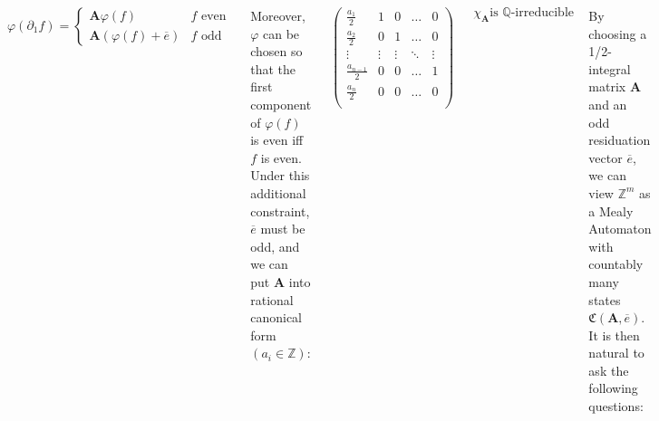\documentclass[24pt]{tikzposter}
\theoremstyle{definition}
\newcommand{\Z}{\mathbb{Z}}
\newcommand{\Q}{\mathbb{Q}}
\newcommand{\del}{\partial}
\begin{document}
\begin{columns}
{    \bigskip

    \[ 
      \varphi(\del_1 f) = 
      \begin{cases} 
        \mathbf{A} \varphi(f) & \text{$f$ even} \\
        \mathbf{A} (\varphi(f) + \overline{e}) & \text{$f$ odd}
      \end{cases}
    \]

    \bigskip
    \bigskip

    Moreover, $\varphi$ can be chosen so that the first component of 
    $\varphi(f)$ is even iff $f$ is even. Under this additional constraint,
    $\overline{e}$ must be odd, and we can put $\mathbf{A}$ into 
    rational canonical form $(a_{i} \in \Z)$:

    \[
      \begin{pmatrix}
        \frac{a_1}{2}     & 1      & 0      & \dots  & 0\\
        \frac{a_2}{2}     & 0      & 1      & \dots  & 0\\ 
        \vdots            & \vdots & \vdots & \ddots & \vdots\\
        \frac{a_{n-1}}{2} & 0      & 0      & \dots  & 1\\
        \frac{a_n}{2}     & 0      & 0      & \dots  & 0\\
      \end{pmatrix}
    \]

    \[ \chi_\mathbf{A} \text{is $\Q$-irreducible} \]

  }



  {
    By choosing a 1/2-integral matrix $\mathbf{A}$ and an odd residuation
    vector $\overline{e}$, we can view $\Z^m$ as a Mealy Automaton with
    countably many states $\mathfrak{C}(\mathbf{A},\overline{e})$. 
    It is then natural to ask the following questions:

    \begin{itemize}
      \item For which choices of $\mathbf{A}$, $\overline{e}$ can we find
        a machine $\mathcal{A}$ as a subautomaton of 
        $\mathfrak{C}(\mathbf{A}, \overline{e})$?

      \item 
    \end{itemize}

  }


\end{columns}
\end{document}
